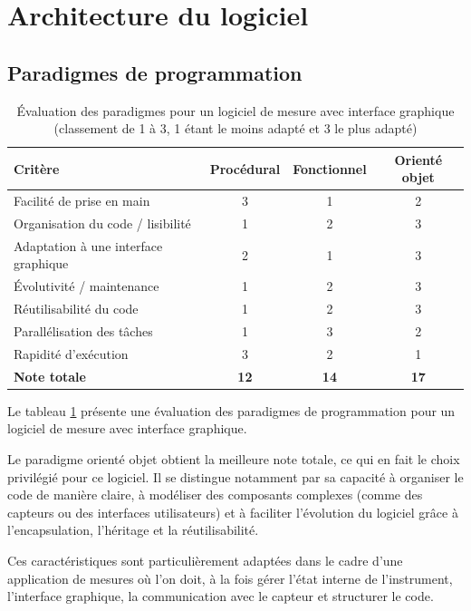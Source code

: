 \section{Architecture du logiciel}
\subsection{Paradigmes de programmation}

\begin{table}[H]
    \centering
    \begin{tabular}{|l|c|c|c|}
        \hline
        \textbf{Critère} & \textbf{Procédural} & \textbf{Fonctionnel} & \textbf{Orienté objet} \\
        \hline
        Facilité de prise en main & 3 & 1 & 2 \\
        Organisation du code / lisibilité & 1 & 2 & 3 \\
        Adaptation à une interface graphique & 2 & 1 & 3 \\
        Évolutivité / maintenance & 1 & 2 & 3 \\
        Réutilisabilité du code & 1 & 2 & 3 \\
        Parallélisation des tâches & 1 & 3 & 2 \\
        Rapidité d'exécution & 3 & 2 & 1 \\
        \hline
        \textbf{Note totale} & \textbf{12} & \textbf{14} & \textbf{17} \\
        \hline
    \end{tabular}
    \caption{Évaluation des paradigmes pour un logiciel de mesure avec interface graphique (classement de 1 à 3, 1 étant le moins adapté et 3 le plus adapté)}
    \label{tab:comparatif_paradigmes}
\end{table}

Le tableau \ref{tab:comparatif_paradigmes} présente une évaluation des paradigmes de programmation pour un logiciel de mesure avec interface graphique.

Le paradigme orienté objet obtient la meilleure note totale, ce qui en fait le choix privilégié pour ce logiciel. Il se distingue notamment par sa capacité à organiser le code de manière claire, à modéliser des composants complexes (comme des capteurs ou des interfaces utilisateurs) et à faciliter l’évolution du logiciel grâce à l’encapsulation, l’héritage et la réutilisabilité.

Ces caractéristiques sont particulièrement adaptées dans le cadre d'une application de mesures où l’on doit, à la fois gérer l’état interne de l’instrument, l’interface graphique, la communication avec le capteur et structurer le code.

